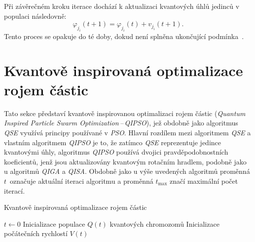 Při závěrečném kroku iterace dochází k aktualizaci kvantových úhlů jedinců v populaci následovně:
\begin{equation*}
    \varphi_{j_i}\left(t+1\right) = \varphi_{j_i}\left(t\right) + v_{j_i}\left(t+1\right).
\end{equation*}
Tento proces se opakuje do té doby, dokud není splněna ukončující podmínka~\cite{qse}.

\section{Kvantově inspirovaná optimalizace rojem částic}\label{sec:qipso}
Tato sekce představí kvantově inspirovanou optimalizaci rojem částic (\emph{Quantum Inspired Particle Swarm Optimization\,--\,QIPSO}), jež obdobně jako algoritmus \emph{QSE} využívá principy používané v \emph{PSO}. 
Hlavní rozdílem mezi algoritmem \emph{QSE} a vlastním algoritmem \emph{QIPSO} je to, že zatímco \emph{QSE} reprezentuje jedince kvantovými úhly, algoritmus \emph{QIPSO} používá dvojici pravděpodobnostních koeficientů, jenž jsou aktualizovány kvantovým rotačním hradlem, podobně jako u algoritmů \emph{QIGA} a \emph{QISA}. 
Obdobně jako u výše uvedených algoritmů proměnná $t$~označuje aktuální iteraci algoritmu a proměnná $t_{\text{max}}$ značí maximální počet iterací. 

\begin{algorithm}[ht]
    \caption{Kvantově inspirovaná optimalizace rojem částic}
    \label{alg:qipso}
    $t \gets 0$\;
    Inicializace populace $Q\left(t\right)$ kvantových chromozomů\;
    Inicializace počátečních rychlostí $V\left(t\right)$\;
\end{algorithm}

